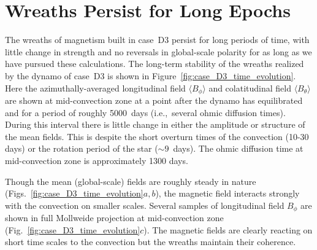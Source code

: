 \section{Wreaths Persist for Long Epochs}
The wreaths of magnetism built in case~D3 persist for
long periods of time, with little change in strength and no reversals
in global-scale polarity for as long as we have pursued
these calculations.  The long-term stability of the wreaths realized
by the dynamo of case~D3 is shown in Figure~\ref{fig:case_D3_time_evolution}.
Here the azimuthally-averaged longitudinal field $\langle B_\phi \rangle$
and colatitudinal field $\langle B_\theta \rangle$ are shown at
mid-convection zone at a point after the dynamo has equilibrated and
for a period of roughly 5000~days (i.e.,~several ohmic diffusion times).  
During this interval there is little
change in either the amplitude or structure of the mean fields.  This
is despite the short overturn times of the convection (10-30
days) or the rotation period of the star ($\sim 9$~days).  The ohmic
diffusion time at mid-convection zone is approximately 1300 days.

Though the mean (global-scale) fields are roughly steady in nature
(Figs.~\ref{fig:case_D3_time_evolution}$a,b$), the magnetic
field interacts strongly with the convection on smaller scales. 
Several samples of longitudinal field $B_\phi$ are shown in full Mollweide projection at
mid-convection zone (Fig.~\ref{fig:case_D3_time_evolution}$c$).  
The magnetic fields are clearly reacting on short time scales to the
convection but the wreaths maintain their coherence.  

